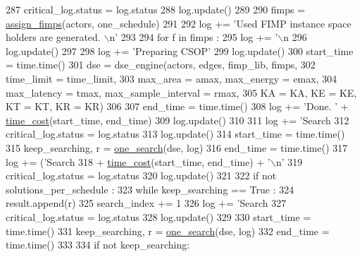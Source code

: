 \begin{DoxyCode}
{{{{{{{{{{{{287       critical\_log.status = log.status
288       log.update()
289 
290       fimps = \hyperlink{namespacesylva_1_1dse_1_1dse__engine__v1_ac7bc9055c7171c3d5156f342722248fc}{assign\_fimps}(actors, one\_schedule)
291 
292       log += \textcolor{stringliteral}{'Used FIMP instance space holders are generated. \(\backslash\)n'}
293 
294       \textcolor{keywordflow}{for} f \textcolor{keywordflow}{in} fimps :
295         log += \textcolor{stringliteral}{'\(\backslash\)n  %
296       log.update()
297 
298       log += \textcolor{stringliteral}{'Preparing CSOP'}
299       log.update()
300       start\_time = time.time()
301       dse = dse\_engine(actors, edges, fimp\_lib, fimps,
302         time\_limit = time\_limit,
303         max\_area = amax, max\_energy = emax,
304         max\_latency = tmax, max\_sample\_interval = rmax,
305         KA = KA, KE = KE, KT = KT, KR = KR)
306 
307       end\_time = time.time()
308       log += \textcolor{stringliteral}{'Done. '} + \hyperlink{namespacesylva_1_1dse_1_1dse_acf83688e18cc0859483b4c9bb70183fd}{time\_cost}(start\_time, end\_time)
309       log.update()
310 
311       log += \textcolor{stringliteral}{'Search %
312       critical\_log.status = log.status
313       log.update()
314       start\_time = time.time()
315       keep\_searching, r = \hyperlink{namespacesylva_1_1dse_1_1dse_a27653b05dda8ab9dab8aa948db5b860a}{one\_search}(dse, log)
316       end\_time = time.time()
317       log += (\textcolor{stringliteral}{'Search %
318            + \hyperlink{namespacesylva_1_1dse_1_1dse_acf83688e18cc0859483b4c9bb70183fd}{time\_cost}(start\_time, end\_time) + \textcolor{stringliteral}{'\(\backslash\)n'}
319       critical\_log.status = log.status
320       log.update()
321 
322       \textcolor{keywordflow}{if} \textcolor{keywordflow}{not} solutions\_per\_schedule :
323         \textcolor{keywordflow}{while} keep\_searching == \textcolor{keyword}{True} :
324           result.append(r)
325           search\_index += 1
326           log += \textcolor{stringliteral}{'Search %
327           critical\_log.status = log.status
328           log.update()
329 
330           start\_time = time.time()
331           keep\_searching, r = \hyperlink{namespacesylva_1_1dse_1_1dse_a27653b05dda8ab9dab8aa948db5b860a}{one\_search}(dse, log)
332           end\_time = time.time()
333 
334           \textcolor{keywordflow}{if} \textcolor{keywordflow}{not} keep\_searching:
}}}}}}}}}}}}}}}}
\end{DoxyCode}
